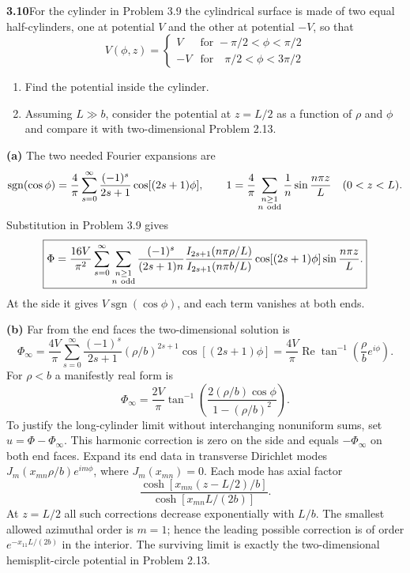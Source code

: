 \par\bigskip
\noindent\textbf{3.10}\quad For the cylinder in Problem 3.9 the cylindrical surface is made of two equal half-cylinders, one at potential $V$ and the other at potential $-V$, so that
\[
V(\phi,z)=\begin{cases}V & \text{for } -\pi/2<\phi<\pi/2\\ -V & \text{for}\quad \pi/2<\phi<3\pi/2\end{cases}
\]
\begin{enumerate}
\item[(a)] Find the potential inside the cylinder.
\item[(b)] Assuming $L\gg b$, consider the potential at $z=L/2$ as a function of $\rho$ and $\phi$ and compare it with two-dimensional Problem 2.13.
\end{enumerate}
\solution

\textbf{(a)} The two needed Fourier expansions are
\[
\operatorname{sgn}(\cos\phi)=\frac4\pi\sum_{s=0}^\infty
\frac{(-1)^s}{2s+1}\cos[(2s+1)\phi],\qquad
1=\frac4\pi\sum_{\substack{n\geq1\\n\ {\rm odd}}}
\frac1n\sin\frac{n\pi z}{L}\quad(0<z<L).
\]
Substitution in Problem 3.9 gives
\[
\boxed{\Phi=\frac{16V}{\pi^2}
\sum_{s=0}^\infty\sum_{\substack{n\geq1\\n\ {\rm odd}}}
\frac{(-1)^s}{(2s+1)n}
\frac{I_{2s+1}(n\pi\rho/L)}{I_{2s+1}(n\pi b/L)}
\cos[(2s+1)\phi]\sin\frac{n\pi z}{L}.}
\]
At the side it gives $V\operatorname{sgn}(\cos\phi)$, and each
term vanishes at both ends.

\textbf{(b)} Far from the end faces the two-dimensional solution is
\[
\Phi_\infty=\frac{4V}{\pi}\sum_{s=0}^\infty
\frac{(-1)^s}{2s+1}(\rho/b)^{2s+1}\cos[(2s+1)\phi]
=\frac{4V}{\pi}\operatorname{Re}\tan^{-1}
\left(\frac\rho b e^{i\phi}\right).
\]
For $\rho<b$ a manifestly real form is
\[
\boxed{\Phi_\infty=\frac{2V}{\pi}
\tan^{-1}\!\left(\frac{2(\rho/b)\cos\phi}{1-(\rho/b)^2}\right).}
\]
To justify the long-cylinder limit without interchanging nonuniform
sums, set $u=\Phi-\Phi_\infty$.  This harmonic correction is zero
on the side and equals $-\Phi_\infty$ on both end faces.  Expand its
end data in transverse Dirichlet modes
$J_m(x_{mn}\rho/b)e^{im\phi}$, where $J_m(x_{mn})=0$.
Each mode has axial factor
\[
\frac{\cosh[x_{mn}(z-L/2)/b]}{\cosh[x_{mn}L/(2b)]}.
\]
At $z=L/2$ all such corrections decrease exponentially with $L/b$.
The smallest allowed azimuthal order is $m=1$; hence the leading
possible correction is of order $e^{-x_{11}L/(2b)}$ in the interior.
The surviving limit is exactly the two-dimensional hemisplit-circle
potential in Problem 2.13.

